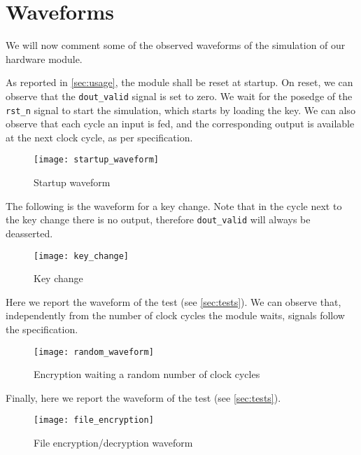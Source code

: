 \section{Waveforms}
We will now comment some of the observed waveforms of the simulation of our hardware module.

As reported in \cref{sec:usage}, the module shall be reset at startup. On reset, we can observe that the \lstinline{dout_valid} signal is set to zero.
We wait for the posedge of the \lstinline{rst_n} signal to start the simulation, which starts by loading the key. We can also observe that each cycle an input is fed, and the corresponding output is available at the next clock cycle, as per specification.
\begin{figure}[!ht]
    \centering
    \texttt{[image: startup\_waveform]}
    \caption{Startup waveform}
    \label{fig:startup_waveform}
\end{figure}

The following is the waveform for a key change. Note that in the cycle next to the key change there is no output, therefore \lstinline{dout_valid} will always be deasserted.
\begin{figure}[!ht]
    \centering
    \texttt{[image: key\_change]}
    \caption{Key change}
    \label{fig:key_change}
\end{figure}

Here we report the waveform of the  test (see \cref{sec:tests}). We can observe that, independently from the number of clock cycles the module waits, signals follow the specification.
\begin{figure}[!ht]
    \centering
    \texttt{[image: random\_waveform]}
    \caption{Encryption waiting a random number of clock cycles}
    \label{fig:random_waveform}
\end{figure}

\clearpage
Finally, here we report the waveform of the  test (see \cref{sec:tests}).
\begin{figure}[!ht]
    \centering
    \texttt{[image: file\_encryption]}
    \caption{File encryption/decryption waveform}
    \label{fig:file_encryption}
\end{figure}